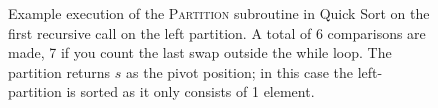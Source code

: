 \begin{figure}
{

}

\caption[Partitioning Example 2]{Example execution of the \textsc{Partition}
subroutine in Quick Sort on the first recursive call on the left partition.  
A total of 6 comparisons are made, 7 if you count the last swap outside the 
while loop.  The partition returns $s$ as the pivot position; in this case
the left-partition is sorted as it only consists of 1 element.}
\label{figure:partitionExample2}

\end{figure}


%

